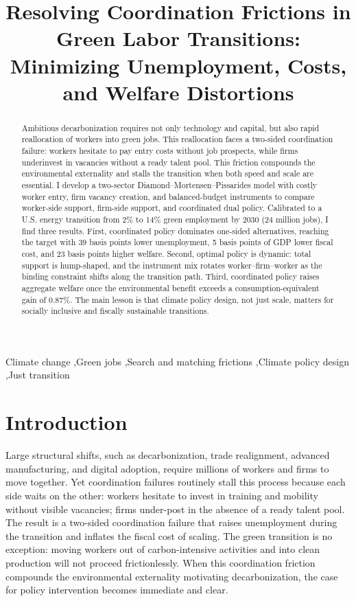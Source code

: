 \documentclass[preprint,12pt]{elsarticle}
\begin{document}
\begin{frontmatter}

\title{Resolving Coordination Frictions in Green Labor Transitions:
Minimizing Unemployment, Costs, and Welfare Distortions}

\begin{abstract}
Ambitious decarbonization requires not only technology and capital, but also rapid reallocation of workers into green jobs. This reallocation faces a two-sided coordination failure: workers hesitate to pay entry costs without job prospects, while firms underinvest in vacancies without a ready talent pool. This friction compounds the environmental externality and stalls the transition when both speed and scale are essential. I develop a two-sector Diamond–Mortensen–Pissarides model with costly worker entry, firm vacancy creation, and balanced-budget instruments to compare worker-side support, firm-side support, and coordinated dual policy. Calibrated to a U.S. energy transition from 2\% to 14\% green employment by 2030 (24 million jobs), I find three results. First, coordinated policy dominates one-sided alternatives, reaching the target with 39 basis points lower unemployment, 5 basis points of GDP lower fiscal cost, and 23 basis points higher welfare. Second, optimal policy is dynamic: total support is hump-shaped, and the instrument mix rotates worker–firm–worker as the binding constraint shifts along the transition path. Third, coordinated policy raises aggregate welfare once the environmental benefit exceeds a consumption-equivalent gain of 0.87\%. The main lesson is that climate policy design, not just scale, matters for socially inclusive and fiscally sustainable transitions.
\end{abstract}

\begin{keyword}
Climate change \sep Green jobs \sep Search and matching frictions \sep Climate policy design \sep  Just transition
\end{keyword}

\end{frontmatter}

\newpage

\section{Introduction}

Large structural shifts, such as decarbonization, trade realignment, advanced manufacturing, and digital adoption, require millions of workers and firms to move together. Yet coordination failures routinely stall this process because each side waits on the other: workers hesitate to invest in training and mobility without visible vacancies; firms under-post in the absence of a ready talent pool. The result is a two-sided coordination failure that raises unemployment during the transition and inflates the fiscal cost of scaling. The green transition is no exception: moving workers out of carbon-intensive activities and into clean production will not proceed frictionlessly. When this coordination friction compounds the environmental externality motivating decarbonization, the case for policy intervention becomes immediate and clear. 
\end{document}
